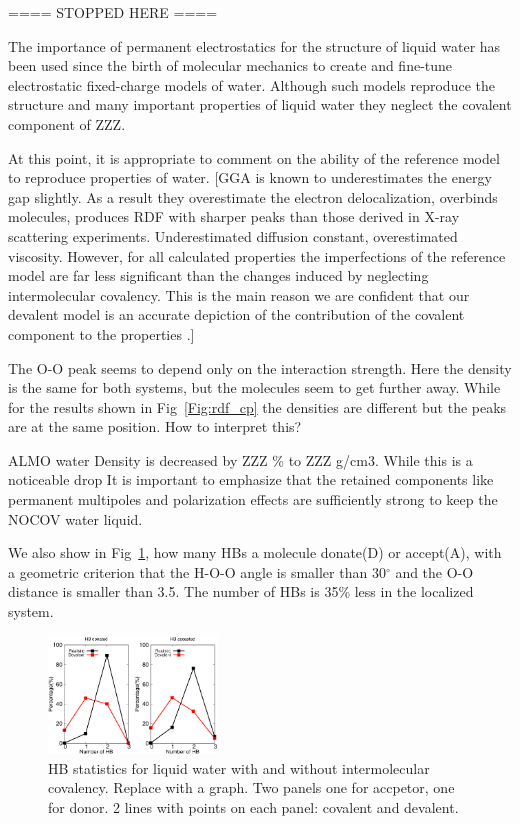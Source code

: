 \documentclass[aps,prl,reprint,amsmath,amssymb]{revtex4-1}
\begin{document}
==== STOPPED HERE ====

The importance of permanent electrostatics for the structure of liquid water has been used since the birth of molecular mechanics to create and fine-tune electrostatic fixed-charge models of water. Although such models reproduce the structure and many important properties of liquid water they neglect the covalent component of ZZZ.


At this point, it is appropriate to comment on the ability of the reference model to reproduce properties of water. [GGA is known to underestimates the energy gap slightly. As a result they overestimate the electron delocalization, overbinds molecules, produces RDF with sharper peaks than those derived in X-ray scattering experiments. Underestimated diffusion constant, overestimated viscosity. However, for all calculated properties the imperfections of the reference model are far less significant than the changes induced by neglecting intermolecular covalency. This is the main reason we are confident that our devalent model is an accurate depiction of the contribution of the covalent component to the properties .]

\new The O-O peak seems to depend only on the interaction strength. Here the density is the same for both systems, but the molecules seem to get further away. While for the results shown in Fig~\ref{Fig:rdf_cp} the densities are different but the peaks are at the same position. How to interpret this? \old

ALMO water Density is decreased by ZZZ \% to ZZZ g/cm3. While this is a noticeable drop It is important to emphasize that the retained components like permanent multipoles and polarization effects are sufficiently strong to keep the NOCOV water liquid. 

We also show in Fig~\ref{fig:HBstat}, how many HBs a molecule donate(D) or accept(A), with a geometric criterion that the H-O-O angle is smaller than 30$^{\circ}$ and the O-O distance is smaller than 3.5\Ang. The number of HBs is 35\% less in the localized system.

\begin{figure}
\includegraphics[width=0.4\textwidth]{new_hbstat}

\caption{HB statistics for liquid water with and without intermolecular covalency. \new Replace with a graph. Two panels one for accpetor, one for donor. 2 lines with points on each panel: covalent and devalent.\old }\label{fig:HBstat}
\end{figure}
\end{document}
